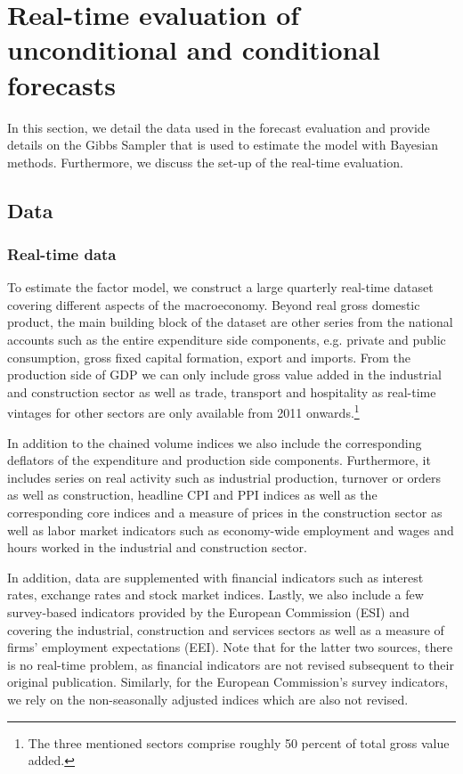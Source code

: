 \documentclass[notitlepage,a4paper,12pt]{article}
\begin{document}
\section{Real-time evaluation of unconditional and conditional forecasts}

In this section, we detail the data used in the forecast evaluation and provide details on the Gibbs Sampler that is used to estimate the model with Bayesian methods. Furthermore, we discuss the set-up of the real-time evaluation. 

\subsection{Data}
\subsubsection{Real-time data}

To estimate the factor model, we construct a large quarterly real-time dataset covering different aspects of the macroeconomy. Beyond real gross domestic product, the main building block of the dataset are other series from the national accounts such as the entire expenditure side components, e.g. private and public consumption, gross fixed capital formation, export and imports. From the production side of GDP we can only include gross value added in the industrial and construction sector as well as trade, transport and hospitality as real-time vintages for other sectors are only available from 2011 onwards.\footnote{The three mentioned sectors comprise roughly 50 percent of total gross value added.} 

In addition to the chained volume indices we also include the corresponding deflators of the expenditure and production side components. Furthermore, it includes series on real activity such as industrial production, turnover or orders as well as construction, headline CPI and PPI indices as well as the corresponding core indices and a measure of prices in the construction sector as well as labor market indicators such as economy-wide employment and wages and hours worked in the industrial and construction sector.    

In addition, data are supplemented with financial indicators such as interest rates, exchange rates and stock market indices. Lastly, we also include a few survey-based indicators provided by the European Commission (ESI) and covering the industrial, construction and services sectors as well as a measure of firms' employment expectations (EEI). Note that for the latter two sources, there is no real-time problem, as financial indicators are not revised subsequent to their original publication. Similarly, for the European Commission's survey indicators, we rely on the non-seasonally adjusted indices which are also not revised. 
\end{document}
